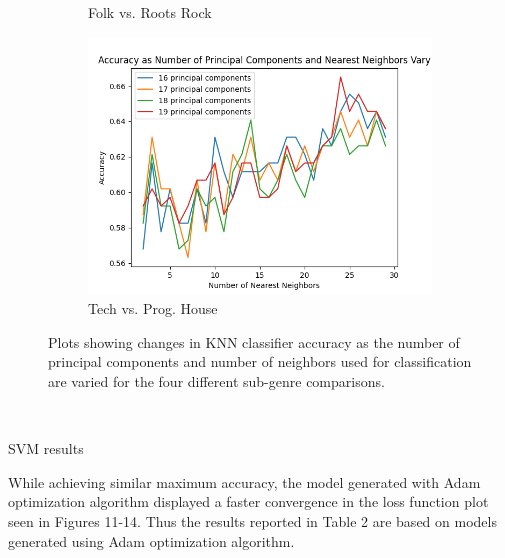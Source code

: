 \documentclass[letterpaper, 12 pt, conference]{ieeeconf}  %
\begin{document}
\begin{figure}[!hb]
\begin{subfigure}{.23\textwidth}
    \caption{Folk vs. Roots Rock}
    \label{fig:knngraph3}
  \end{subfigure}
  \begin{subfigure}{.23\textwidth}
    \centering
    \includegraphics[width=.8\linewidth]{knnplot_thph.png}
    \caption{Tech vs. Prog. House}
    \label{fig:knngraph4}
  \end{subfigure}
  \caption{Plots showing changes in KNN classifier accuracy as the number of principal components and number of neighbors used for classification are varied for the four different sub-genre comparisons.}
  \label{fig:knngraphs}
\end{figure}



\newline \,\,
\par SVM results 
\newline \,\,
\par While achieving similar maximum accuracy, the model generated with Adam optimization algorithm displayed a faster convergence in the loss function plot seen in Figures 11-14. Thus the results reported in Table 2 are based on models generated using Adam optimization algorithm.
\end{document}
